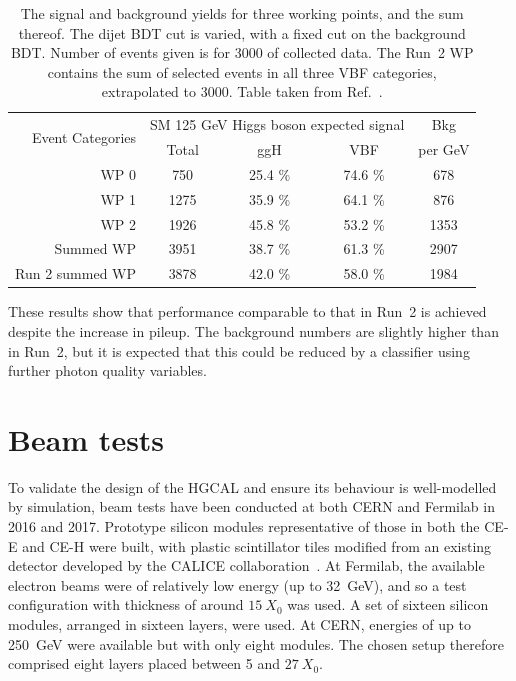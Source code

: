\begin{table}
  \centering
  \begin{tabular}{ r | c |  c |  c |  c }
  \multirow{2}{*}{Event Categories} &\multicolumn{3}{c|}{SM 125 GeV Higgs boson expected signal} & Bkg \\
    &  Total & ggH & VBF & per GeV \\
  \hline
  WP 0 &            750   &  25.4 \%  &  74.6 \%  &  678  \\
  WP 1 &            1275  &  35.9 \%  &  64.1 \%  &  876  \\
  WP 2 &            1926  &  45.8 \%  &  53.2 \%  &  1353 \\
  Summed WP &       3951  &  38.7 \%  &  61.3 \%  &  2907 \\
  Run 2 summed WP & 3878  &  42.0 \%  &  58.0 \%  &  1984 \\
  \end{tabular}
  \caption{The signal and background yields for three working points, and the sum thereof.
  The dijet BDT cut is varied, with a fixed cut on the background BDT.
  Number of events given is for \SI{3000}{\fbinv} of collected data. 
  The Run~2 WP contains the sum of selected events in all three VBF categories, extrapolated to \SI{3000}{\fbinv}.
  Table taken from Ref.~\cite{HGCAL}.}
  \label{tab:hgcal_yields}
\end{table}

These results show that performance comparable to that in Run~2 
is achieved despite the increase in pileup.
The background numbers are slightly higher than in Run~2, 
but it is expected that this could be reduced by a classifier using further photon quality variables.

\section{Beam tests}

To validate the design of the HGCAL and ensure its behaviour is well-modelled by simulation, 
beam tests have been conducted at both CERN and Fermilab in 2016 and 2017. 
Prototype silicon modules representative of those in both the CE-E and CE-H were built, 
with plastic scintillator tiles modified from an existing detector 
developed by the CALICE collaboration~\cite{CALICE}.
At Fermilab, the available electron beams were of relatively low energy (up to \SI{32}{GeV}), 
and so a test configuration with thickness of around $\SI{15}{X_0}$ was used.
A set of sixteen silicon modules, arranged in sixteen layers, were used.
At CERN, energies of up to \SI{250}{GeV} were available but with only eight modules.
The chosen setup therefore comprised eight layers placed between 5 and $\SI{27}{X_0}$.

